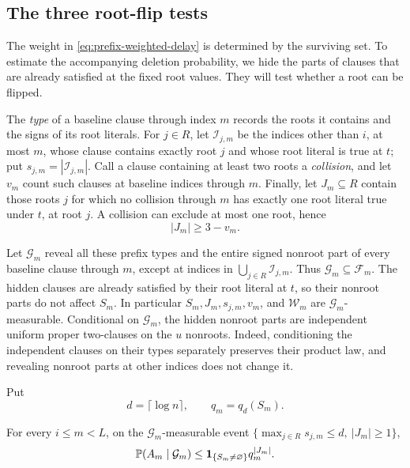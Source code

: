 \subsection{The three root-flip tests}

The weight in \eqref{eq:prefix-weighted-delay} is determined by the
surviving set.  To estimate the accompanying deletion probability, we
hide the parts of clauses that are already satisfied at the fixed root
values.  They will test whether a root can be flipped.

The \emph{type} of a baseline clause through index \(m\) records the
roots it contains and the signs of its root literals.  For \(j\in R\),
let \(\mathcal I_{j,m}\) be the indices other than \(i\), at most
\(m\), whose clause contains exactly root \(j\) and whose root literal
is true at \(t\); put \(s_{j,m}=|\mathcal I_{j,m}|\).  Call a clause
containing at least two roots a \emph{collision}, and let \(v_m\) count
such clauses at baseline indices through \(m\).  Finally, let
\(J_m\subseteq R\) contain those roots \(j\) for which no collision through \(m\)
has exactly one root literal true under \(t\), at root \(j\).  A collision
can exclude at most one root, hence
\begin{equation}\label{eq:prefix-available-roots}
 |J_m|\ge3-v_m.
\end{equation}

Let \(\mathcal G_m\) reveal all these prefix types and the entire signed
nonroot part of every baseline clause through \(m\), except at indices
in \(\bigcup_{j\in R}\mathcal I_{j,m}\).  Thus
\(\mathcal G_m\subseteq\mathcal F_m\).  The hidden clauses are already
satisfied by their root literal at \(t\), so their nonroot parts do not
affect \(S_m\).  In particular \(S_m,J_m,s_{j,m},v_m\), and
\(\mathcal W_m\) are \(\mathcal G_m\)-measurable.  Conditional on
\(\mathcal G_m\), the hidden nonroot parts are independent uniform
proper two-clauses on the \(u\) nonroots.  Indeed, conditioning the
independent clauses on their types separately preserves their product
law, and revealing nonroot parts at other indices does not change it.

Put
\[
 d=\lceil\log n\rceil,\qquad q_m=q_d(S_m).
\]

\begin{lemma}
\label{lem:prefix-root-tests}
For every \(i\le m<L\), on the \(\mathcal G_m\)-measurable event
\(\{\max_{j\in R}s_{j,m}\le d,\ |J_m|\ge1\}\),
\begin{equation}\label{eq:prefix-root-tests}
 \mathbb P(A_m\mid\mathcal G_m)
 \le\mathbf 1_{\{S_m\ne\varnothing\}}q_m^{|J_m|}.
\end{equation}
\end{lemma}

